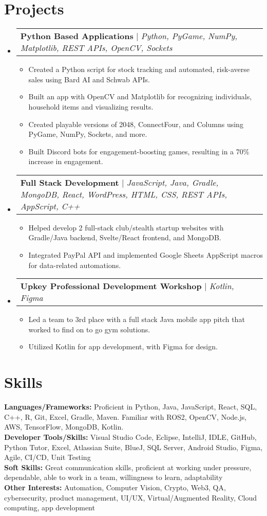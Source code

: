 \documentclass[letterpaper,11pt]{article}
\makeatletter
\newcommand{\resumeItem}[1]{
  \item\small{
    {#1 \vspace{-2pt}}
  }
}
\newcommand{\resumeProjectHeading}[2]{
    \item
    \begin{tabular*}{0.97\textwidth}{l@{\extracolsep{\fill}}r}
      \small#1 & #2 \\
    \end{tabular*}\vspace{-7pt}
}
\newcommand{\resumeSubHeadingListStart}{\begin{itemize}[leftmargin=0.15in, label={}]}
\newcommand{\resumeSubHeadingListEnd}{\end{itemize}}
\newcommand{\resumeItemListStart}{\begin{itemize}}
\newcommand{\resumeItemListEnd}{\end{itemize}\vspace{-5pt}}
\makeatother
\begin{document}
\section{Projects}
\resumeSubHeadingListStart
\resumeProjectHeading
      {\textbf{Python Based Applications} $|$ \emph{Python, PyGame, NumPy, Matplotlib, REST APIs, OpenCV, Sockets}}{}
        \resumeItemListStart
          \resumeItem{Created a Python script for stock tracking and automated, risk-averse sales using Bard AI and Schwab APIs.}
          \resumeItem{Built an app with OpenCV and Matplotlib for recognizing individuals, household items and visualizing results.}
          \resumeItem{Created playable versions of 2048, ConnectFour, and Columns using PyGame, NumPy, Sockets, and more.}
          \resumeItem{Built Discord bots for engagement-boosting games, resulting in a 70\% increase in engagement.}
        \resumeItemListEnd
      \resumeProjectHeading
          {\textbf{Full Stack Development} $|$ \emph{JavaScript, Java, Gradle, MongoDB, React, WordPress, HTML, CSS, REST APIs, AppScript, C++}}{}
          \resumeItemListStart
            \resumeItem{Helped develop 2 full-stack club/stealth startup websites with Gradle/Java backend, Svelte/React frontend, and MongoDB.}
            \resumeItem{Integrated PayPal API and implemented Google Sheets AppScript macros for data-related automations.}
          \resumeItemListEnd
      \resumeProjectHeading
          {\textbf{Upkey Professional Development Workshop} $|$ \emph{Kotlin, Figma}}{}
          \resumeItemListStart
          \resumeItem{Led a team to 3rd place with a full stack Java mobile app pitch that worked to find on to go gym solutions.}
          \resumeItem{Utilized Kotlin for app development, with Figma for design.}
          \resumeItemListEnd

\resumeSubHeadingListEnd



%
\section{Skills}
 \begin{itemize}[leftmargin=0.15in, label={}]
    \small{\item{
     \textbf{Languages/Frameworks: }{Proficient in Python, Java, JavaScript, React, SQL, C++, R, Git, Excel, Gradle, Maven. Familiar with ROS2, OpenCV, Node.js, AWS, TensorFlow, MongoDB, Kotlin.
     } \\
     \textbf{Developer Tools/Skills: }{Visual Studio Code, Eclipse, IntelliJ, IDLE, GitHub, Python Tutor, Excel, Atlassian Suite, BlueJ, SQL Server, Android Studio, Figma, Agile, CI/CD, Unit Testing} \\
     \textbf{Soft Skills: }{Great communication skills, proficient at working under pressure, dependable, able to work in a team, willingness to learn, adaptability}\\
     \textbf{Other Interests: }{Automation, Computer Vision, Crypto, Web3, QA, cybersecurity, product management, UI/UX, Virtual/Augmented Reality, Cloud computing, app development}
    }}
 \end{itemize}


\end{document}
